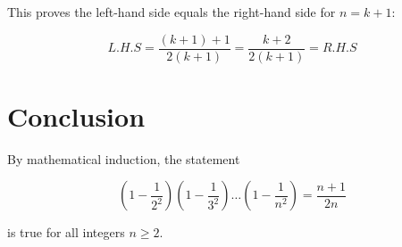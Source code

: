 \documentclass[12pt]{article}
\begin{document}
This proves the left-hand side equals the right-hand side for \( n = k+1 \):

\[
L.H.S = \frac{(k+1)+1}{2(k+1)} = \frac{k+2}{2(k+1)} = R.H.S
\]

\section{Conclusion}

By mathematical induction, the statement

\[
(1-\frac{1}{2^2})(1-\frac{1}{3^2}) \ldots (1-\frac{1}{n^2}) = \frac{n+1}{2n}
\]

is true for all integers \( n \geq 2 \).
\end{document}
